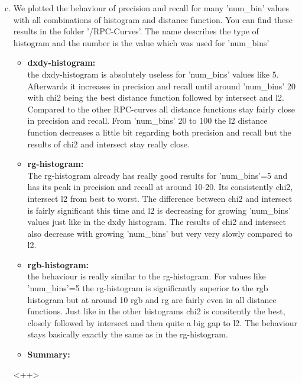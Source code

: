 \documentclass[12pt]{article}
\begin{document}
\begin{enumerate}[a)]
    \setcounter{enumi}{2}
    \item 
        We plotted the behaviour of precision and recall for many 'num\_bin' values with all combinations of histogram and distance function. You can find these results in the folder '/RPC-Curves'. The name describes the type of histogram and the number is the value which was used for 'num\_bins'
        \begin{itemize}
            \item 
                \textbf{dxdy-histogram:}\\
                the dxdy-histogram is absolutely useless for 'num\_bins' values like 5. Afterwards it increases in precision and recall until around 'num\_bins' 20 with chi2 being the best distance function followed by intersect and l2. Compared to the other RPC-curves all distance functions stay fairly close in precision and recall. From 'num\_bins' 20 to 100 the l2 distance function decreases a little bit regarding both precision and recall but the results of chi2 and intersect stay really close.
            \item 
                \textbf{rg-histogram:}\\
                The rg-histogram already has really good results for 'num\_bins'=5 and has its peak in precision and recall at around 10-20. Its consistently chi2, intersect l2 from best to worst. The difference between chi2 and intersect is fairly significant this time and l2 is decreasing for growing 'num\_bins' values just like in the dxdy histogram. The results of chi2 and intersect also decrease with growing 'num\_bins' but very very slowly compared to l2.
            \item 
                \textbf{rgb-histogram:}\\
                the behaviour is really similar to the rg-histogram. For values like 'num\_bins'=5 the rg-histogram is significantly superior to the rgb histogram but at around 10 rgb and rg are fairly even in all distance functions. Just like in the other histograms chi2 is consitently the best, closely followed by intersect and then quite a big gap to l2. The behaviour stays basically exactly the same as in the rg-histogram.

            \item
                \textbf{Summary:}\\


                

        \end{itemize}<++>


\end{enumerate}
\end{document}
